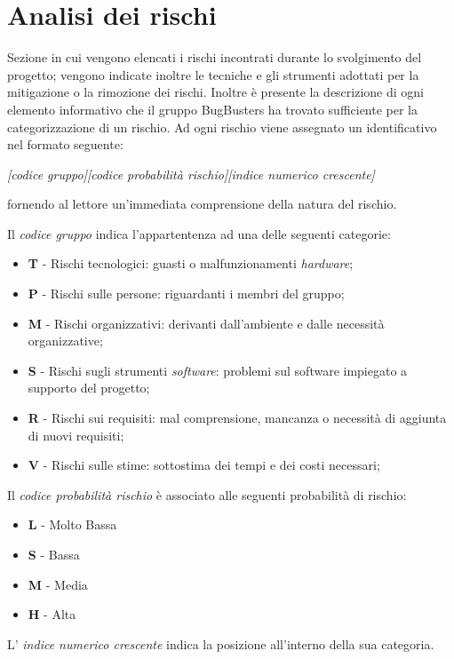 \section{Analisi dei rischi} 
Sezione in cui vengono elencati i rischi incontrati durante lo svolgimento del progetto; vengono indicate inoltre le tecniche e gli strumenti adottati per la mitigazione o la rimozione dei rischi. Inoltre \`e presente la descrizione di ogni elemento informativo che il gruppo BugBusters ha trovato sufficiente per la categorizzazione di un rischio.
Ad ogni rischio viene assegnato un identificativo nel formato seguente: 

\begin{center}
\textit{[codice gruppo][codice probabilit\`a rischio][indice numerico crescente]}  
\end{center}

fornendo al lettore un'immediata comprensione della natura del rischio.

Il \textit{codice gruppo} indica l'appartentenza ad una delle seguenti categorie:
\begin{itemize}
\item \textbf{T} - Rischi tecnologici: guasti o malfunzionamenti \textit{hardware};
\item \textbf{P} - Rischi sulle persone: riguardanti i membri del gruppo;
\item \textbf{M} - Rischi organizzativi: derivanti dall'ambiente e dalle necessit\`a organizzative;
\item \textbf{S} - Rischi sugli strumenti \textit{software}: problemi sul software impiegato a supporto del progetto;
\item \textbf{R} - Rischi sui requisiti: mal comprensione, mancanza o necessit\`a di aggiunta di nuovi requisiti;
\item \textbf{V} - Rischi sulle stime: sottostima dei tempi e dei costi necessari;
\end{itemize}

Il \textit{codice probabilit\`a rischio} \`e associato alle seguenti probabilit\`a di rischio: 
\begin{itemize}
\item \textbf{L} - Molto Bassa
\item \textbf{S} - Bassa
\item \textbf{M} - Media
\item \textbf{H} - Alta
\end{itemize}

L' \textit{indice numerico crescente} indica la posizione all'interno della sua categoria. 

